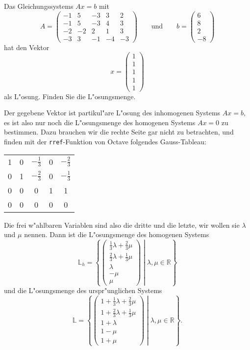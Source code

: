 Das Gleichungssystems $Ax=b$ mit
\[
A=\begin{pmatrix}
-1& 5&-3& 3& 2\\
-1& 5&-3& 4& 3\\
-2&-2& 2& 1& 3\\
-3& 3&-1&-4&-3
\end{pmatrix} \qquad\text{und}\qquad
b=\begin{pmatrix}
6\\
8\\
2\\
-8
\end{pmatrix}
\]
hat den Vektor
\[
x=\begin{pmatrix}1\\1\\1\\1\\1\end{pmatrix}
\]
als L"osung.
Finden Sie die L"osungsmenge.

\begin{loesung}
Der gegebene Vektor ist partikul"are L"osung des inhomogenen Systems
$Ax=b$, es ist also nur noch die L"osungsmenge des homogenen Systems
$Ax=0$ zu bestimmen.
Dazu brauchen wir die rechte Seite gar nicht zu betrachten,
und finden mit der {\tt rref}-Funktion von Octave folgendes Gauss-Tableau:
\begin{center}
\begin{tabular}{|ccccc|}
\hline
1&0&$-\frac13$&0&$-\frac23$\\
0&1&$-\frac23$&0&$-\frac13$\\
0&0&         0&1&1\\
0&0&         0&0&0\\
\hline
\end{tabular}
\end{center}
Die frei w"ahlbaren Variablen sind also die dritte und die letzte,
wir wollen sie $\lambda$ und $\mu$ nennen. Dann ist die L"osungsmenge
des homogenen Systems
\[
{\mathbb L}_h
=
\left\{
\left.
\begin{pmatrix}
\frac13\lambda+\frac23\mu\\
\frac23\lambda+\frac13\mu\\
\lambda\\
-\mu\\
\mu
\end{pmatrix}
\;
\right|
\;
\lambda,\mu\in\mathbb R
\right\}
\]
und die L"osungsmenge des urspr"unglichen Systems
\[
{\mathbb L}
=
\left\{
\left.
\begin{pmatrix}
1+\frac13\lambda+\frac23\mu\\
1+\frac23\lambda+\frac13\mu\\
1+\lambda\\
1-\mu\\
1+\mu
\end{pmatrix}
\;
\right|
\;
\lambda,\mu\in\mathbb R
\right\}.
\]
\end{loesung}
